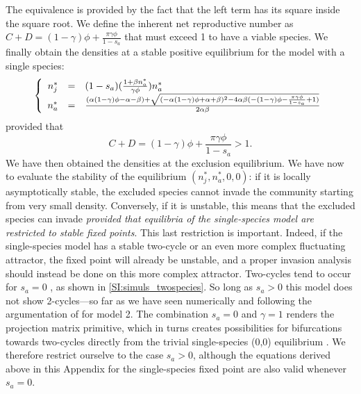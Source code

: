 \documentclass{article}
\begin{document}
The equivalence is provided by the fact that the left term has its square inside the square root. We define the inherent net reproductive number as $C+D = (1-\gamma)\phi +\frac{\pi \gamma \phi}{1-s_a}$ that must exceed 1 to have a viable species. We finally obtain the densities at a stable positive equilibrium for the model with a single species:
\begin{equation}
    \left\{
\begin{array}{r c l}
n_j^* &=&  (1-s_a)(\frac{1+\beta n_a^*}{\gamma \phi})n_a^*\\
n_a^* &=& \frac{(\alpha (1-\gamma)\phi-\alpha-\beta) + \sqrt{(-\alpha (1-\gamma)\phi + \alpha + \beta)^2 - 4\alpha\beta(-(1-\gamma)\phi-\frac{\pi\gamma\phi}{1-s_a}+1)}}{2\alpha\beta}
\end{array}
\right. \label{eq:fixedpointeq_model1_singlesp}
\end{equation}
provided that
\begin{equation}
   C+D = (1-\gamma)\phi +\frac{\pi \gamma \phi}{1-s_a} > 1. 
\end{equation}
We have then obtained the densities at the exclusion equilibrium. We have now to evaluate the stability of the equilibrium $(n_j^*,n_a^*,0,0)$: if it is locally asymptotically stable, the excluded species cannot invade the community starting from very small density. Conversely, if it is unstable, this means that the excluded species can invade \textit{provided that equilibria of the single-species model are restricted to stable fixed points}. This last restriction is important. Indeed, if the single-species model has a stable two-cycle or an even more complex fluctuating attractor, the fixed point will already be unstable, and a proper invasion analysis should instead be done on this more complex attractor. Two-cycles tend to occur for $s_a=0$ \citep{cushing2007coexistence}, as shown in \ref{SI:simuls_twospecies}. So long as $s_a>0$ this model does not show 2-cycles---so far as we have seen numerically and following the argumentation of \citet{cushing2007coexistence} for model 2. The combination $s_a = 0$ and $\gamma = 1$ renders the projection matrix primitive, which in turns creates possibilities for bifurcations towards two-cycles directly from the trivial single-species (0,0) equilibrium \citep{cushing1989ebenman,cushing2006nonlinear}. We therefore restrict ourselve to the case $s_a>0$, although the equations derived above in this Appendix for the single-species fixed point are also valid whenever $s_a=0$. 
\end{document}
